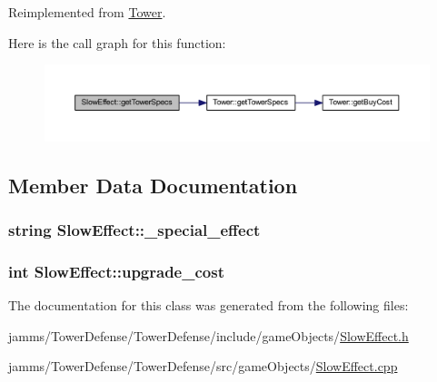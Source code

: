 Reimplemented from \hyperlink{class_tower_a2427fab36824f8ec98273cb5e563e0c9}{Tower}.



Here is the call graph for this function\+:
\nopagebreak
\begin{figure}[H]
\begin{center}
\leavevmode
\includegraphics[width=350pt]{class_slow_effect_aaa162ffbad9bc163a53b0927b035dcb8_cgraph}
\end{center}
\end{figure}




\subsection{Member Data Documentation}
\hypertarget{class_slow_effect_a8e3148b27be8020c4216d61d5f783194}{
\subsubsection[{\+\_\+special\+\_\+effect}]{\setlength{\rightskip}{0pt plus 5cm}string Slow\+Effect\+::\+\_\+special\+\_\+effect\hspace{0.3cm}{\ttfamily [private]}}}\label{class_slow_effect_a8e3148b27be8020c4216d61d5f783194}
\hypertarget{class_slow_effect_aa96bd2eca9e2b835afed17e9986d9845}{
\subsubsection[{upgrade\+\_\+cost}]{\setlength{\rightskip}{0pt plus 5cm}int Slow\+Effect\+::upgrade\+\_\+cost\hspace{0.3cm}{\ttfamily [static]}}}\label{class_slow_effect_aa96bd2eca9e2b835afed17e9986d9845}


The documentation for this class was generated from the following files\+:\begin{DoxyCompactItemize}
\item 
jamms/\+Tower\+Defense/\+Tower\+Defense/include/game\+Objects/\hyperlink{_slow_effect_8h}{Slow\+Effect.\+h}\item 
jamms/\+Tower\+Defense/\+Tower\+Defense/src/game\+Objects/\hyperlink{_slow_effect_8cpp}{Slow\+Effect.\+cpp}\end{DoxyCompactItemize}
